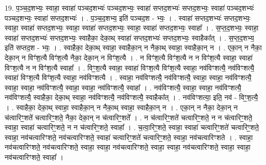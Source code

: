 \documentclass[17pt]{extarticle}
\begin{document}
19. प॒ञ्च॒द॒शभ्यः॒ स्वाहा॒ स्वाहा॑ पञ्चद॒शभ्यः॑ पञ्चद॒शभ्यः॒ स्वाहा॑ सप्तद॒शभ्यः॑ सप्तद॒शभ्यः॒ स्वाहा॑ पञ्चद॒शभ्यः॑ पञ्चद॒शभ्यः॒ स्वाहा॑ सप्तद॒शभ्यः॑ । . प॒ञ्च॒द॒शभ्य॒ इति॑ पञ्चद॒श - भ्यः॒ । . स्वाहा॑ सप्तद॒शभ्यः॑ सप्तद॒शभ्यः॒ स्वाहा॒ स्वाहा॑ सप्तद॒शभ्यः॒ स्वाहा॒ स्वाहा॑ सप्तद॒शभ्यः॒ स्वाहा॒ स्वाहा॑ सप्तद॒शभ्यः॒ स्वाहा᳚ । . स॒प्त॒द॒शभ्यः॒ स्वाहा॒ स्वाहा॑ सप्तद॒शभ्यः॑ सप्तद॒शभ्यः॒ स्वाहैका॒ देका॒थ् स्वाहा॑ सप्तद॒शभ्यः॑ सप्तद॒शभ्यः॒ स्वाहैका᳚त् । . स॒प्त॒द॒शभ्य॒ इति॑ सप्तद॒श - भ्यः॒ । . स्वाहैका॒ देका॒थ् स्वाहा॒ स्वाहैका॒न् न नैका॒थ् स्वाहा॒ स्वाहैका॒न् न । . एका॒न् न नैका॒ देका॒न् न विꣳ॑श॒त्यै विꣳ॑श॒त्यै नैका॒ देका॒न् न विꣳ॑श॒त्यै । . न विꣳ॑श॒त्यै विꣳ॑श॒त्यै न न विꣳ॑श॒त्यै स्वाहा॒ स्वाहा॑ विꣳश॒त्यै न न विꣳ॑श॒त्यै स्वाहा᳚ । . विꣳ॒॒श॒त्यै स्वाहा॒ स्वाहा॑ विꣳश॒त्यै विꣳ॑श॒त्यै स्वाहा॒ नव॑विꣳशत्यै॒ नव॑विꣳशत्यै॒ स्वाहा॑ विꣳश॒त्यै विꣳ॑श॒त्यै स्वाहा॒ नव॑विꣳशत्यै । . स्वाहा॒ नव॑विꣳशत्यै॒ नव॑विꣳशत्यै॒ स्वाहा॒ स्वाहा॒ नव॑विꣳशत्यै॒ स्वाहा॒ स्वाहा॒ नव॑विꣳशत्यै॒ स्वाहा॒ स्वाहा॒ नव॑विꣳशत्यै॒ स्वाहा᳚ । . नव॑विꣳशत्यै॒ स्वाहा॒ स्वाहा॒ नव॑विꣳशत्यै॒ नव॑विꣳशत्यै॒ स्वाहैका॒ देका॒थ् स्वाहा॒ नव॑विꣳशत्यै॒ नव॑विꣳशत्यै॒ स्वाहैका᳚त् । . नव॑विꣳशत्या॒ इति॒ नव॑ - विꣳ॒॒श॒त्यै॒ । . स्वाहैका॒ देका॒थ् स्वाहा॒ स्वाहैका॒न् न नैका॒थ् स्वाहा॒ स्वाहैका॒न् न । . एका॒न् न नैका॒ देका॒न् न च॑त्वारिꣳ॒॒शते॑ चत्वारिꣳ॒॒शते॒ नैका॒ देका॒न् न च॑त्वारिꣳ॒॒शते᳚ । . न च॑त्वारिꣳ॒॒शते॑ चत्वारिꣳ॒॒शते॒ न न च॑त्वारिꣳ॒॒शते॒ स्वाहा॒ स्वाहा॑ चत्वारिꣳ॒॒शते॒ न न च॑त्वारिꣳ॒॒शते॒ स्वाहा᳚ । . च॒त्वा॒रिꣳ॒॒शते॒ स्वाहा॒ स्वाहा॑ चत्वारिꣳ॒॒शते॑ चत्वारिꣳ॒॒शते॒ स्वाहा॒ नव॑चत्वारिꣳशते॒ नव॑चत्वारिꣳशते॒ स्वाहा॑ चत्वारिꣳ॒॒शते॑ चत्वारिꣳ॒॒शते॒ स्वाहा॒ नव॑चत्वारिꣳशते । . स्वाहा॒ नव॑चत्वारिꣳशते॒ नव॑चत्वारिꣳशते॒ स्वाहा॒ स्वाहा॒ नव॑चत्वारिꣳशते॒ स्वाहा॒ स्वाहा॒ नव॑चत्वारिꣳशते॒ स्वाहा॒ स्वाहा॒ नव॑चत्वारिꣳशते॒ स्वाहा᳚ । \newline
\end{document}
